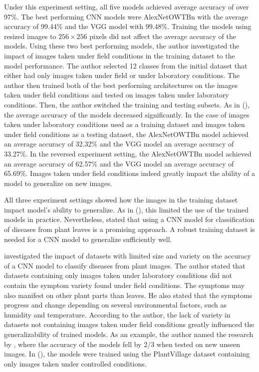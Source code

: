 \documentclass{BachelorBUI}
\begin{document}
        Under this experiment setting, all five models achieved average accuracy of over 97\%. The best performing CNN models were AlexNetOWTBn with the average accuracy of 99.44\% and the VGG model with 99.48\%. Training the models using resized images to $256 \times 256$ pixels did not affect the average accuracy of the models. Using these two best performing models, the author investigated the impact of images taken under field conditions in the training dataset to the model performance. The author selected 12 classes from the initial dataset that either had only images taken under field or under laboratory conditions. The author then trained both of the best performing architectures on the images taken under field conditions and tested on images taken under laboratory conditions. Then, the author switched the training and testing subsets. As in (\cite{Mohanty:2016}), the average accuracy of the models decreased significantly. In the case of images taken under laboratory conditions used as a training dataset and images taken under field conditions as a testing dataset, the AlexNetOWTBn model achieved an average accuracy of 32.32\% and the VGG model an average accuracy of 33.27\%. In the reversed experiment setting, the AlexNetOWTBn model achieved an average accuracy of 62.57\% and the VGG model an average accuracy of 65.69\%. Images taken under field conditions indeed greatly impact the ability of a model to generalize on new images. 

        All three experiment settings showed how the images in the training dataset impact model's ability to generalize. As in (\cite{Mohanty:2016}), this limited the use of the trained models in practice. Nevertheless, \textcite{Ferentinos:2018} stated that using a CNN model for classification of diseases from plant leaves is a promising approach. A robust training dataset is needed for a CNN model to generalize sufficiently well. 


        \textcite{Barbedo:2018:1} investigated the impact of datasets with limited size and variety on the accuracy of a CNN model to classify diseases from plant images. The author stated that datasets containing only images taken under laboratory conditions did not contain the symptom variety found under field conditions. The symptoms may also manifest on other plant parts than leaves. He also stated that the symptoms progress and change depending on several environmental factors, such as humidity and temperature. According to the author, the lack of variety in datasets not containing images taken under field conditions greatly influenced the generalizability of trained models. As an example, the author named the research by \textcite{Mohanty:2016}, where the accuracy of the models fell by 2/3 when tested on new unseen images. In (\cite{Mohanty:2016}), the models were trained using the PlantVillage dataset containing only images taken under controlled conditions.
\end{document}
